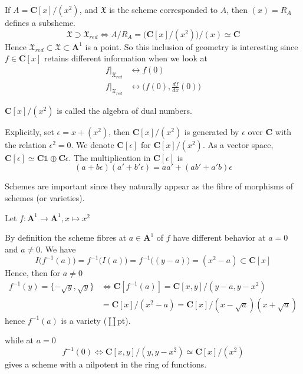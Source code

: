 \documentclass[
11pt, %
letterpaper， %
oneside, %
headinclude,footinclude, %
BCOR5mm, %
]{scrartcl}
\newcommand{\C}{{\mathbf{C}}}
\newcommand{\A}{{\mathbf{A}}}
\begin{document}
\begin{ex}
	If $A=\C[x]/(x^2)$, and  $\mathfrak{X}$ is the scheme corresponded to $A$, then $(x)=R_A$ defines a subsheme.
	\begin{equation*}
	\mathfrak{X}\supset \mathfrak{X}_{red} \Leftrightarrow A/R_A=\big(\C[x]/(x^2)\big)/(x)\simeq \C
	\end{equation*}
	Hence $\mathfrak{X}_{red}\subset \mathfrak{X}\subset \A^1$ is a point. So this inclusion of geometry is interesting since $f\in \C[x]$ retains different information when we look at
	\begin{align*}
	f\big|_{\mathfrak{X}_{red}} &\longleftrightarrow f(0)\\	f\big|_{\mathfrak{X}_{red}} &\longleftrightarrow \Big(f(0), \frac{df}{dx}(0)\Big)
	\end{align*}
\end{ex}
\begin{definition}
$\C[x]/(x^2)$ is called the algebra of dual numbers.
\end{definition}
Explicitly, set $\epsilon=x+(x^2)$, then $\C[x]/(x^2)$ is generated by $\epsilon$ over $\C$ with the relation $\epsilon^2=0$. We denote $\C[\epsilon]$ for $\C[x]/(x^2)$. As a vector space, $\C[\epsilon]\simeq \C\mathbb{1}\oplus \C \epsilon$. The multiplication in $\C[\epsilon]$ is 
\begin{equation}
(a+b\epsilon)(a'+b'\epsilon)=aa'+(ab'+a'b)\epsilon
\end{equation}
\begin{rem}
	Schemes are important since they naturally appear as the fibre of morphisms of schemes (or varieties).
\end{rem}
\begin{ex}
	Let $f:\A^1\to \A^1, x\mapsto x^2$
	
	By definition the scheme fibres at $a\in \A^1$ of $f$ have different behavior at $a=0$ and $a\not=0$. We have 
	\begin{equation*}
	I\big(f^{-1}(a)\big)= f^{-1}\big( I(a)\big)= f^{-1}  \big( (y-a) \big)=(x^2-a  )\subset \C[x]
	\end{equation*}
	Hence, 
	 then for $a\not=0$
	 \begin{align*}
	 f^{-1}(y)=\{-\sqrt{y},\sqrt{y} \} &\Leftrightarrow \C[f^{-1}(a)]= \C[x,y]/(y-a,y-x^2)\\
	 &=\C[x]/(x^2-a)=\C[x]/(x-\sqrt{a})(x+\sqrt{a})
	 \end{align*}
	 hence $f^{-1}(a)$ is a variety ($\coprod$pt). 
	 
	 
	while at $a=0$
	\begin{equation*}
	f^{-1}(0)\Leftrightarrow \C[x,y]/(y,y-x^2)\simeq \C[x]/(x^2)
	\end{equation*} 
	gives a scheme with a nilpotent in the ring of functions. 
\end{ex}
\end{document}

